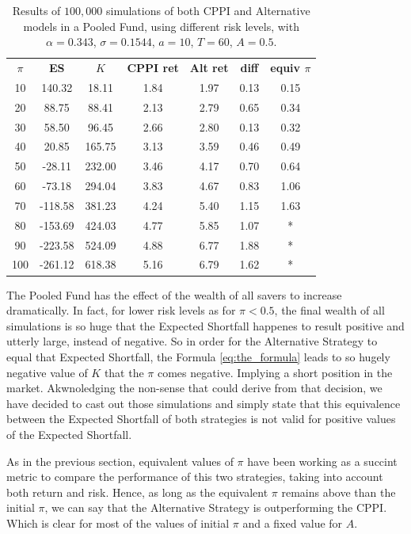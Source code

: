 \begin{table}[h]
\centering
\caption{Results of $100,000$ simulations of both CPPI and Alternative models in a Pooled Fund, using different risk levels, with $\alpha = 0.343$, $\sigma = 0.1544$, $a = 10$, $T = 60$, $A = 0.5$.}
\label{tab:cppi_alt_mort}
\begin{tabular}{ccccccc}
\textbf{$\pi$} & \textbf{ES } & \textbf{$K$} & \textbf{CPPI ret} & \textbf{Alt ret} & \textbf{diff}  & \textbf{equiv $\pi$}\\
10  & 140.32  & 18.11 & 1.84 & 1.97 & 0.13 & 0.15 \\
20  & 88.75  & 88.41 & 2.13 & 2.79 & 0.65 & 0.34 \\
30  & 58.50  & 96.45 & 2.66 & 2.80 & 0.13 & 0.32 \\
40  & 20.85  & 165.75  & 3.13 & 3.59 & 0.46 & 0.49 \\
50  & -28.11 & 232.00  & 3.46 & 4.17 & 0.70 & 0.64 \\
60  & -73.18 & 294.04 & 3.83 & 4.67 & 0.83 & 1.06 \\
70  & -118.58 & 381.23 & 4.24 & 5.40 & 1.15 & 1.63 \\
80  & -153.69 & 424.03 & 4.77 & 5.85  & 1.07 & *                 \\
90  & -223.58 & 524.09 & 4.88 & 6.77 & 1.88 & *                 \\
100 & -261.12   & 618.38 & 5.16 & 6.79 & 1.62 & *

\end{tabular}
\end{table}


The Pooled Fund has the effect of the wealth of all savers to increase dramatically. In fact, for lower risk levels as for $\pi < 0.5$, the final wealth of all simulations is so huge that the Expected Shortfall happenes to result positive and utterly large, instead of negative. So in order for the Alternative Strategy to equal that Expected Shortfall, the Formula \ref{eq:the_formula} leads to so hugely negative value of $K$ that the $\pi$ comes negative. Implying a short position in the market. Akwnoledging the non-sense that could derive from that decision, we have decided to cast out those simulations and simply state that this equivalence between the Expected Shortfall of both strategies is not valid for positive values of the Expected Shortfall.

As in the previous section, equivalent values of $\pi$ have been working as a succint metric to compare the performance of this two strategies, taking into account both return and risk. Hence, as long as the equivalent $\pi$ remains above than the initial $\pi$, we can say that the Alternative Strategy is outperforming
the CPPI. Which is clear for most of the values of initial $\pi$ and a fixed value for $A$.

